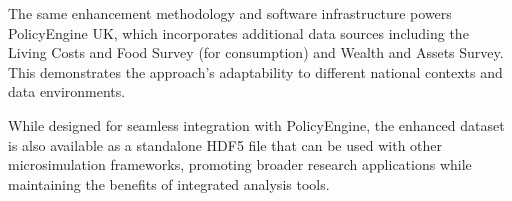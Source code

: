The same enhancement methodology and software infrastructure powers PolicyEngine UK, which incorporates additional data sources including the Living Costs and Food Survey (for consumption) and Wealth and Assets Survey. This demonstrates the approach's adaptability to different national contexts and data environments.

While designed for seamless integration with PolicyEngine, the enhanced dataset is also available as a standalone HDF5 file that can be used with other microsimulation frameworks, promoting broader research applications while maintaining the benefits of integrated analysis tools.